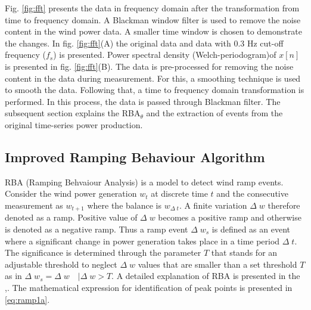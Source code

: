 Fig. \ref{fig:fft} presents the data in frequency domain after the transformation from time to frequency domain. A Blackman window filter is used to remove the noise content in the wind power data. A smaller time window is chosen to demonstrate the changes. In fig. \ref{fig:fft}(A) the original data and data with 0.3 Hz cut-off frequency ($f_s$) is presented. Power spectral density (Welch-periodogram)of $x[n]$ is presented in fig. \ref{fig:fft}(B). 
The data is pre-processed for removing the noise content in the data during measurement. For this, a smoothing technique is used to smooth the data. Following that, a time to frequency domain transformation is performed. In this process, the data is passed through Blackman filter. The subsequent section explains the RBA$_\theta$ and the extraction of events from the original time-series power production.

\subsection{Improved Ramping Behaviour Algorithm}

RBA (Ramping Behvaiour Analysis) is a model to detect wind ramp events. Consider the wind power generation $w_t$ at discrete time $t$ and the consecutive measurement as $w_{t+1}$ where the balance is $w_{\Delta \;t}$. A finite variation $\Delta \; w$ therefore denoted as a ramp. Positive value of $\Delta \; w$ becomes a positive ramp and otherwise is denoted as a negative ramp. 
Thus a ramp event $\Delta \; w_s$ is defined as an event where a significant change in power generation takes place in a time period $\Delta \; t$. The significance is determined through the parameter $T$ that stands for an adjustable threshold to neglect $\Delta \; w$ values that are smaller than a set threshold $T$ as in  $\Delta \; w_s = \Delta \; w \quad | \Delta \; w > T $. A detailed explanation of RBA is presented in the \cite{ArticleNo1},\cite{ArticleNo2}. The mathematical expression for identification of peak points is presented in \eqref{eq:ramp1a}.
 
